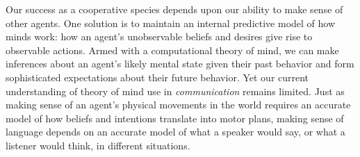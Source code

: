 \documentclass[manuscript]{stjour}
\begin{document}
Our success as a cooperative species depends upon our ability to make sense of other agents. 
One solution is to maintain an internal predictive model of how minds work: how an agent's unobservable beliefs and desires give rise to observable actions. 
Armed with a computational theory of mind, we can make inferences about an agent's likely mental state given their past behavior and form sophisticated expectations about their future behavior. 
Yet our current understanding of theory of mind use in \emph{communication} remains limited. 
Just as making sense of an agent's physical movements in the world requires an accurate model of how beliefs and intentions translate into motor plans, making sense of language depends on an accurate model of what a speaker would say, or what a listener would think, in different situations. 
\end{document}
